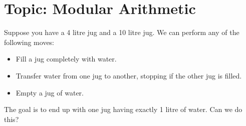 

\DeclareRobustCommand{\stirling}{\genfrac\{\}{0pt}{}}
\setcounter{secnumdepth}{0} 

\newcommand{\weekNum}{7} %
\newcommand{\meetingDate}{Mar 5, 2025} 


\pagestyle{empty}
\sloppy
\maketitle
 
\section{Topic: Modular Arithmetic}

\begin{problem}
    Suppose you have a 4 litre jug and a 10 litre jug. We can perform any of the following moves:
    \begin{itemize}[itemsep=5pt, topsep=5pt]
        \item Fill a jug completely with water.
        \item Transfer water from one jug to another, stopping if the other jug is filled.
        \item Empty a jug of water.
    \end{itemize}
    The goal is to end up with one jug having exactly 1 litre of water. Can we do this?
\end{problem}

